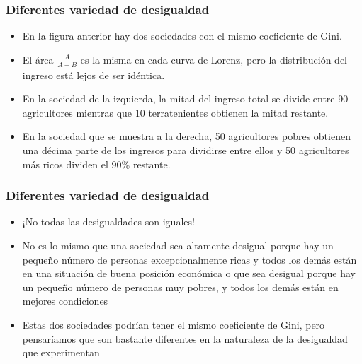\documentclass{beamer}
\begin{document}
\begin{frame} 
\frametitle{Diferentes variedad de desigualdad}
\begin{itemize}
\item En la figura anterior hay dos sociedades con el mismo coeficiente de Gini.
\item El área $\frac{A}{A + B}$ es la misma en cada curva de Lorenz, pero la distribución del ingreso está lejos de ser idéntica.
\item En la sociedad de la izquierda, la mitad del ingreso total se divide entre 90 agricultores mientras que 10 terratenientes obtienen la mitad restante. 
\item En la sociedad que se muestra a la derecha, 50 agricultores pobres obtienen una décima parte de los ingresos para dividirse entre ellos y 50 agricultores más ricos dividen el 90\% restante.
\end{itemize}
\end{frame}

\begin{frame} 
\frametitle{Diferentes variedad de desigualdad}
\begin{itemize}
\item ¡No todas las desigualdades son iguales!
\item No es lo mismo que una sociedad sea altamente desigual porque hay un pequeño número de personas excepcionalmente ricas y todos los demás están en una situación de buena posición económica o que sea desigual porque hay un pequeño número de personas muy pobres, y todos los demás están en mejores condiciones
\item Estas dos sociedades podrían tener el mismo coeficiente de Gini, pero pensaríamos que son bastante diferentes en la naturaleza de la desigualdad que experimentan
\end{itemize}
\end{frame}
\end{document}

